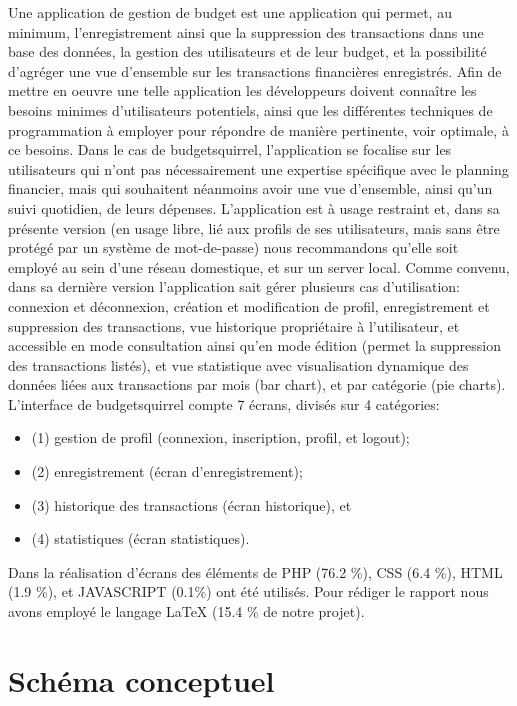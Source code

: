 \documentclass[a4paper,12pt]{article}
\begin{document}
Une application de gestion de budget est une application qui permet, au minimum, l'enregistrement ainsi que la suppression des transactions dans une base des données, la gestion des utilisateurs et de leur budget, et la possibilité d'agréger une vue d'ensemble sur les transactions financières enregistrés. Afin de mettre en oeuvre une telle application les développeurs doivent connaître les besoins minimes d'utilisateurs potentiels, ainsi que les différentes techniques de programmation à employer pour répondre de manière pertinente, voir optimale, à ce besoins.
Dans le cas de budgetsquirrel, l'application se focalise sur les utilisateurs qui n’ont pas nécessairement une expertise spécifique avec le planning financier, mais qui souhaitent néanmoins avoir une vue d’ensemble, ainsi qu’un suivi quotidien, de leurs dépenses. L'application est à usage restraint et, dans sa présente version (en usage libre, lié aux profils de ses utilisateurs, mais sans être protégé par un système de mot-de-passe) nous recommandons qu'elle soit employé au sein d'une réseau domestique, et sur un server local.
Comme convenu, dans sa dernière version l'application sait gérer plusieurs cas d'utilisation: connexion et déconnexion, création et modification de profil, enregistrement et suppression des transactions, vue historique propriétaire à l'utilisateur, et accessible en mode consultation ainsi qu'en mode édition (permet la suppression des transactions listés), et vue statistique avec visualisation dynamique des données liées aux transactions par mois (bar chart), et par catégorie (pie charts).
L'interface de budgetsquirrel compte 7 écrans, divisés sur 4 catégories:
\begin{itemize}[label=$\ast$]
\item (1) gestion de profil (connexion, inscription, profil, et logout);
\item (2) enregistrement (écran d'enregistrement);
\item (3) historique des transactions (écran historique), et 
\item (4) statistiques (écran statistiques).
\end{itemize}
Dans la réalisation d'écrans des éléments de PHP (76.2 \%), CSS (6.4 \%), HTML (1.9 \%),  et JAVASCRIPT (0.1\%) ont été utilisés. Pour rédiger le rapport nous avons employé le langage LaTeX (15.4 \% de notre projet).

\section{Schéma conceptuel}
\end{document}

